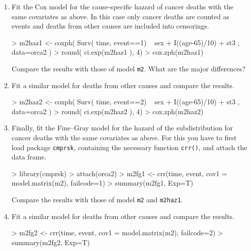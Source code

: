 \begin{enumerate}

\item
Fit the Cox model for the cause-specific hazard of cancer deaths
with the same covariates as above. In this case
only cancer deaths are counted as events and deaths from other causes
are included into censorings.
\begin{Schunk}
\begin{Sinput}
> m2haz1 <- coxph( Surv( time, event==1)  ~ sex + I((age-65)/10) + st3 , data=orca2 )
> round( ci.exp(m2haz1 ), 4)
> cox.zph(m2haz1)
\end{Sinput}
\end{Schunk}
Compare the results with those of model \texttt{m2}. What are the major differences?

\item
 Fit a similar model for deaths from other causes and compare the results.
\begin{Schunk}
\begin{Sinput}
> m2haz2 <- coxph( Surv( time, event==2)  ~ sex + I((age-65)/10) + st3 , data=orca2 )
> round( ci.exp(m2haz2 ), 4)
> cox.zph(m2haz2)
\end{Sinput}
\end{Schunk}

\item
Finally, fit the Fine--Gray model for the hazard of the subdistribution
for cancer deaths with the same covariates as above. For this you have to
first load package \texttt{cmprsk}, containing the necessary function
\texttt{crr()}, and attach the data frame.
\begin{Schunk}
\begin{Sinput}
> library(cmprsk)
> attach(orca2)
> m2fg1 <- crr(time, event, cov1 = model.matrix(m2), failcode=1)
> summary(m2fg1, Exp=T)
\end{Sinput}
\end{Schunk}

Compare the results with those of model \texttt{m2} and \texttt{m2haz1}.

\item
 Fit a similar model for deaths from other causes and compare the results.
\begin{Schunk}
\begin{Sinput}
> m2fg2 <- crr(time, event, cov1 = model.matrix(m2), failcode=2)
> summary(m2fg2, Exp=T)
\end{Sinput}
\end{Schunk}
\end{enumerate}


